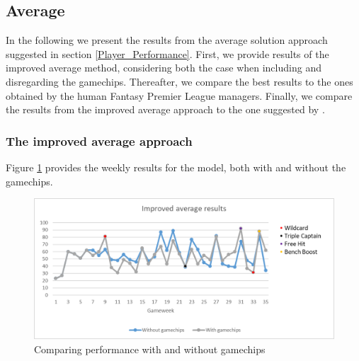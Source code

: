 \subsection{Average} \label{Average_results}
In the following we present the results from the average solution approach suggested in section \ref{Player_Performance}. First, we provide results of the improved average method, considering both the case when including and disregarding the gamechips. Thereafter, we compare the best results to the ones obtained by the human Fantasy Premier League managers. Finally, we compare the results from the improved average approach to the one suggested by \cite{Bonomo}.

\subsubsection{The improved average approach} \label{Improved_avg_results}
Figure \ref{With_Without_Chips} provides the weekly results for the model, both with and without the gamechips. 

\begin{figure}[H]
    \centering
    \includegraphics[scale=0.80]{fig/chapter_7/Gamechips_vs_without_colour.png}
    \caption{Comparing performance with and without gamechips}
\label{With_Without_Chips}    
\end{figure}


